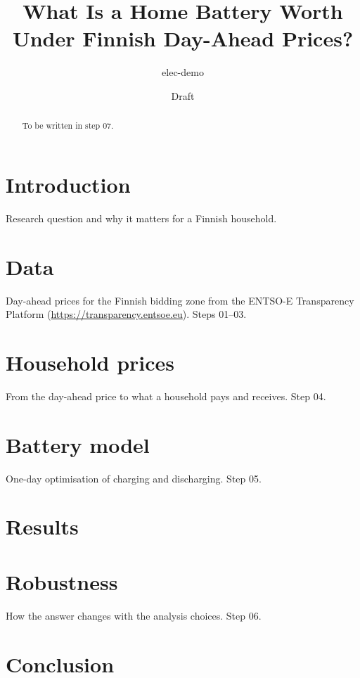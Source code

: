 \documentclass[11pt,a4paper]{article}
\title{What Is a Home Battery Worth Under Finnish Day-Ahead Prices?}
\author{elec-demo}
\date{Draft}
\begin{document}
\maketitle

\begin{abstract}
To be written in step 07.
\end{abstract}

\section{Introduction}
Research question and why it matters for a Finnish household.

\section{Data}
Day-ahead prices for the Finnish bidding zone from the ENTSO-E
Transparency Platform (\url{https://transparency.entsoe.eu}).
Steps 01--03.

\section{Household prices}
From the day-ahead price to what a household pays and receives. Step 04.

\section{Battery model}
One-day optimisation of charging and discharging. Step 05.

\section{Results}

\section{Robustness}
How the answer changes with the analysis choices. Step 06.

\section{Conclusion}
\end{document}
